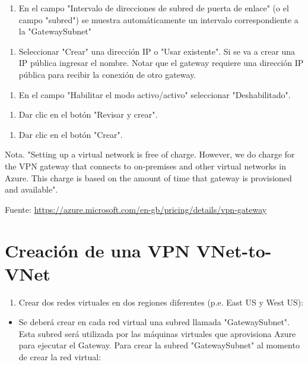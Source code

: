 \begin{enumerate}
\item En el campo "Intervalo de direcciones de subred de puerta de enlace" (o el campo "subred") se muestra automáticamente un intervalo correspondiente a la "GatewaySubnet"
\end{enumerate}

\begin{enumerate}
\item Seleccionar "Crear" una dirección IP o "Usar existente". Si se va a crear una IP pública ingresar el nombre. Notar que el gateway requiere una dirección IP pública para recibir la conexión de otro gateway.
\end{enumerate}

\begin{enumerate}
\item En el campo "Habilitar el modo activo/activo" seleccionar "Deshabilitado".
\end{enumerate}

\begin{enumerate}
\item Dar clic en el botón "Revisar y crear".
\end{enumerate}

\begin{enumerate}
\item Dar clic en el botón "Crear".
\end{enumerate}

Nota. "Setting up a virtual network is free of charge. However, we do charge for the VPN gateway that connects to on-premises and other virtual networks in Azure. This charge is based on the amount of time that gateway is provisioned and available".

Fuente: \url{https://azure.microsoft.com/en-gb/pricing/details/vpn-gateway}

\section{Creación de una VPN VNet-to-VNet}

\begin{enumerate}
\item Crear dos redes virtuales en dos regiones diferentes (p.e. East US y West US):
\end{enumerate}

\begin{itemize}
\item Se deberá crear en cada red virtual una subred llamada "GatewaySubnet". Esta subred será utilizada por las máquinas virtuales que aprovisiona Azure para ejecutar el Gateway. Para crear la subred "GatewaySubnet" al momento de crear la red virtual:
\end{itemize}

